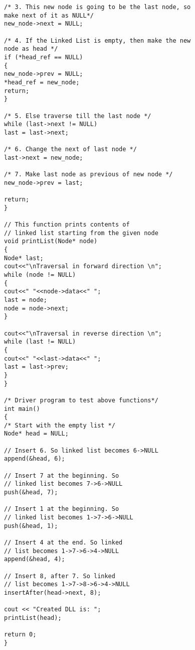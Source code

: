 \begin{lstlisting}
/* 3. This new node is going to be the last node, so 
make next of it as NULL*/
new_node->next = NULL; 

/* 4. If the Linked List is empty, then make the new 
node as head */
if (*head_ref == NULL)
{ 
new_node->prev = NULL; 
*head_ref = new_node; 
return; 
} 

/* 5. Else traverse till the last node */
while (last->next != NULL) 
last = last->next; 

/* 6. Change the next of last node */
last->next = new_node; 

/* 7. Make last node as previous of new node */
new_node->prev = last; 

return; 
} 

// This function prints contents of 
// linked list starting from the given node 
void printList(Node* node) 
{ 
Node* last; 
cout<<"\nTraversal in forward direction \n"; 
while (node != NULL) 
{ 
cout<<" "<<node->data<<" "; 
last = node; 
node = node->next; 
} 

cout<<"\nTraversal in reverse direction \n"; 
while (last != NULL) 
{ 
cout<<" "<<last->data<<" "; 
last = last->prev; 
} 
} 

/* Driver program to test above functions*/
int main() 
{ 
/* Start with the empty list */
Node* head = NULL; 

// Insert 6. So linked list becomes 6->NULL 
append(&head, 6); 

// Insert 7 at the beginning. So 
// linked list becomes 7->6->NULL 
push(&head, 7); 

// Insert 1 at the beginning. So 
// linked list becomes 1->7->6->NULL 
push(&head, 1); 

// Insert 4 at the end. So linked 
// list becomes 1->7->6->4->NULL 
append(&head, 4); 

// Insert 8, after 7. So linked 
// list becomes 1->7->8->6->4->NULL 
insertAfter(head->next, 8); 

cout << "Created DLL is: "; 
printList(head); 

return 0; 
} 
\end{lstlisting}
